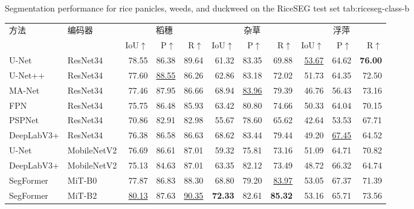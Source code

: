 \begin{table}[!htb]
  \centering
    {Segmentation performance for rice panicles, weeds, and duckweed on the RiceSEG test set}
    {tab:riceseg-class-b}
  \begin{spacing}{1.2}
    \small
    \setlength{\tabcolsep}{1.5pt}
    \renewcommand{\arraystretch}{1.15}
    \begin{tabular*}{\linewidth}{@{\extracolsep{\fill}}ll*{9}{r}@{}}
      \toprule
      方法 & 编码器 & \multicolumn{3}{c}{稻穗}
        & \multicolumn{3}{c}{杂草} & \multicolumn{3}{c}{浮萍} \\
      \cmidrule(lr){3-5}\cmidrule(lr){6-8}\cmidrule(lr){9-11}
      & & IoU\(\uparrow\) & P\(\uparrow\) & R\(\uparrow\)
        & IoU\(\uparrow\) & P\(\uparrow\) & R\(\uparrow\)
        & IoU\(\uparrow\) & P\(\uparrow\) & R\(\uparrow\) \\
      \midrule
      U-Net & ResNet34
        & 78.55 & 86.38 & 89.64 & 61.32 & 83.35 & 69.88
        & \underline{53.67} & 64.62 & \textbf{76.00} \\
      U-Net++ & ResNet34
        & 77.60 & \underline{88.55} & 86.26 & 62.86 & 83.18 & 72.02
        & 51.73 & 64.35 & 72.50 \\
      MA-Net & ResNet34
        & 77.46 & 87.95 & 86.66 & 68.94 & \underline{83.96} & 79.39
        & 46.76 & 56.43 & 73.16 \\
      FPN & ResNet34
        & 75.75 & 86.48 & 85.93 & 63.42 & 80.80 & 74.66
        & 50.33 & 64.04 & 70.15 \\
      PSPNet & ResNet34
        & 70.86 & 82.91 & 82.98 & 55.67 & 78.60 & 65.62
        & 42.64 & 53.53 & 67.71 \\
      DeepLabV3+ & ResNet34
        & 76.38 & 86.58 & 86.63 & 68.62 & 83.44 & 79.44
        & 49.20 & \underline{67.45} & 64.52 \\
      U-Net & MobileNetV2
        & 76.69 & 86.61 & 87.01 & 59.32 & 75.81 & 73.16
        & 51.09 & 64.71 & 70.82 \\
      DeepLabV3+ & MobileNetV2
        & 75.13 & 84.63 & 87.01 & 63.35 & 82.12 & 73.49
        & 48.72 & 66.32 & 64.74 \\
      SegFormer & MiT-B0
        & 77.87 & 86.83 & 88.30 & 68.80 & 79.20 & \underline{83.97}
        & 53.05 & 67.37 & 71.39 \\
      SegFormer & MiT-B2
        & \underline{80.13} & 87.63 & \underline{90.35}
        & \textbf{72.33} & 82.61 & \textbf{85.32} & 53.16 & 65.71 & 73.56 \\

\end{tabular*}
\end{spacing}
\end{table}
